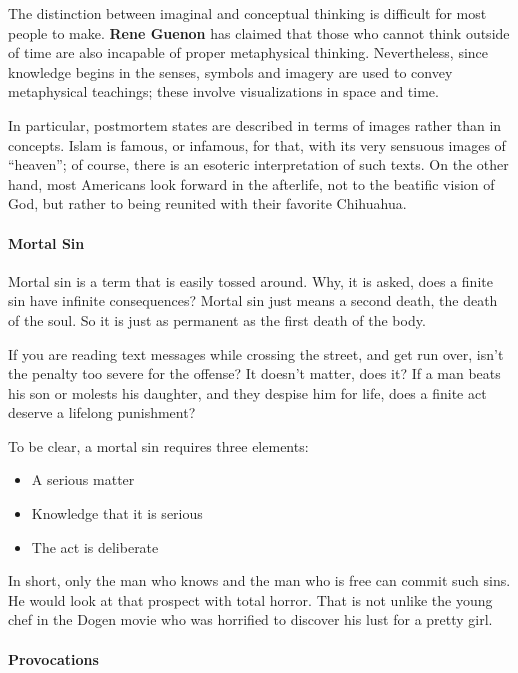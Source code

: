 The distinction between imaginal and conceptual thinking is difficult for most people to make. \textbf{Rene Guenon} has claimed that those who cannot think outside of time are also incapable of proper metaphysical thinking. Nevertheless, since knowledge begins in the senses, symbols and imagery are used to convey metaphysical teachings; these involve visualizations in space and time.

In particular, postmortem states are described in terms of images rather than in concepts. Islam is famous, or infamous, for that, with its very sensuous images of ``heaven''; of course, there is an esoteric interpretation of such texts. On the other hand, most Americans look forward in the afterlife, not to the beatific vision of God, but rather to being reunited with their favorite Chihuahua.

\paragraph{Mortal Sin}


Mortal sin is a term that is easily tossed around. Why, it is asked, does a finite sin have infinite consequences? Mortal sin just means a second death, the death of the soul. So it is just as permanent as the first death of the body.

If you are reading text messages while crossing the street, and get run over, isn't the penalty too severe for the offense? It doesn't matter, does it? If a man beats his son or molests his daughter, and they despise him for life, does a finite act deserve a lifelong punishment?

To be clear, a mortal sin requires three elements:

\begin{itemize}


\item A serious matter

\item Knowledge that it is serious

\item The act is deliberate
\end{itemize}


In short, only the man who knows and the man who is free can commit such sins. He would look at that prospect with total horror. That is not unlike the young chef in the Dogen movie who was horrified to discover his lust for a pretty girl.

\paragraph{Provocations}


